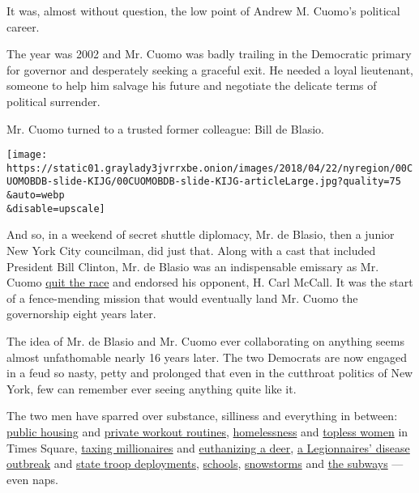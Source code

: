 It was, almost without question, the low point of Andrew M. Cuomo's
political career.

The year was 2002 and Mr. Cuomo was badly trailing in the Democratic
primary for governor and desperately seeking a graceful exit. He needed
a loyal lieutenant, someone to help him salvage his future and negotiate
the delicate terms of political surrender.

Mr. Cuomo turned to a trusted former colleague: Bill de Blasio.

\texttt{[image: https://static01.graylady3jvrrxbe.onion/images/2018/04/22/nyregion/00CUOMOBDB-slide-KIJG/00CUOMOBDB-slide-KIJG-articleLarge.jpg?quality=75\\\&auto=webp\\\&disable=upscale]}

And so, in a weekend of secret shuttle diplomacy, Mr. de Blasio, then a
junior New York City councilman, did just that. Along with a cast that
included President Bill Clinton, Mr. de Blasio was an indispensable
emissary as Mr. Cuomo
\href{https://www.nytimes3xbfgragh.onion/2002/09/04/nyregion/2002-campaign-announcement-cuomo-quits-race-backs-mccall-for-governorship.html}{quit
the race} and endorsed his opponent, H. Carl McCall. It was the start of
a fence-mending mission that would eventually land Mr. Cuomo the
governorship eight years later.

The idea of Mr. de Blasio and Mr. Cuomo ever collaborating on anything
seems almost unfathomable nearly 16 years later. The two Democrats are
now engaged in a feud so nasty, petty and prolonged that even in the
cutthroat politics of New York, few can remember ever seeing anything
quite like it.

The two men have sparred over substance, silliness and everything in
between:
\href{https://www.nytimes3xbfgragh.onion/2018/04/02/nyregion/cuomo-nycha-state-of-emergency.html}{public
housing} and
\href{https://twitter.com/melissadderosa/status/976873129296449538}{private
workout routines},
\href{http://observer.com/2017/10/de-blasio-cuomo-homeless-subway/}{homelessness}
and
\href{https://www.politico.com/states/new-york/city-hall/story/2015/08/esd-joins-fray-against-topless-women-in-times-square-000000}{topless
women} in Times Square,
\href{https://www.nytimes3xbfgragh.onion/2014/01/22/nyregion/cuomo-prekindergarten-proposal.html}{taxing
millionaires} and
\href{https://nypost.com/2016/12/15/deer-who-came-to-manhattan-to-find-a-mate-will-be-put-down/}{euthanizing
a deer},
\href{https://www.wsj.com/articles/cuomo-de-blasio-clash-over-legionnaires-outbreak-1438993349}{a
Legionnaires' disease outbreak} and
\href{https://www.nytimes3xbfgragh.onion/2017/06/26/nyregion/cuomos-deployment-of-troopers-in-city-frustrates-police-leaders.html}{state
troop deployments},
\href{https://www.nytimes3xbfgragh.onion/2017/06/30/nyregion/de-blasio-cuomo-new-york-city.html}{schools},
\href{https://www.nytimes3xbfgragh.onion/2015/01/28/nyregion/new-york-blizzard.html}{snowstorms}
and
\href{https://www.nytimes3xbfgragh.onion/2017/08/06/nyregion/bill-de-blasio-will-push-for-tax-on-wealthy-to-fix-subway.html}{the
subways} --- even naps.

